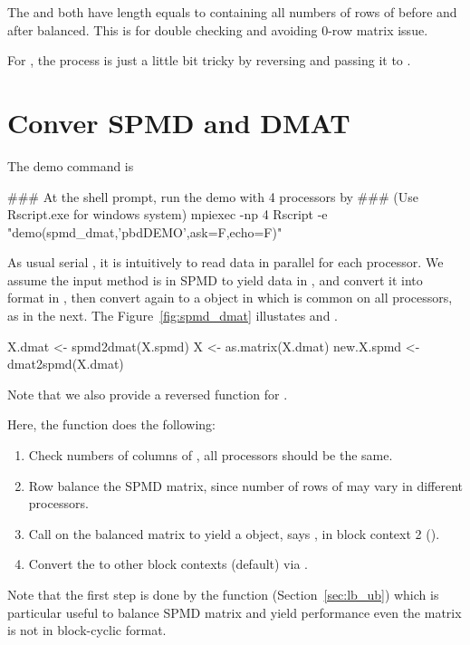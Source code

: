 The  and  both have length equals to
 containing all numbers of rows of 
before and after balanced. This is for double checking and avoiding 0-row
matrix issue.

For , the process is just a little bit tricky by reversing
 and passing it to .






\section[Convert of SPMD and DMAT]{Conver SPMD and DMAT}
\label{sec:spmd_dmat}

The demo command is
\begin{Command}
### At the shell prompt, run the demo with 4 processors by
### (Use Rscript.exe for windows system)
mpiexec -np 4 Rscript -e "demo(spmd_dmat,'pbdDEMO',ask=F,echo=F)"
\end{Command}

As usual serial , it is intuitively to read data in parallel
for each processor. We assume the input method is in SPMD to yield
data in , and convert it into 
format in , then convert again to a 
object in  which is common on all processors, as in the next.
The Figure~\ref{fig:spmd_dmat} illustates  and .
\begin{Code}[title=R Code]
X.dmat <- spmd2dmat(X.spmd)
X <- as.matrix(X.dmat)
new.X.spmd <- dmat2spmd(X.dmat)
\end{Code}
Note that we also provide a reversed function  for
.

Here, the  function does the following:
\begin{enumerate}
\item Check numbers of columns of , all
      processors should be the same.
\item Row balance the SPMD matrix, since number of rows of
       may vary in different processors.
\item Call  on the balanced matrix to yield a  object,
      says , in block context 2 ().
\item Convert the  to other block contexts
      (default) via .
\end{enumerate}
Note that the first step is done by the  function
(Section~\ref{sec:lb_ub})
which is particular useful to balance SPMD matrix and yield performance
even the matrix is not in block-cyclic format.

